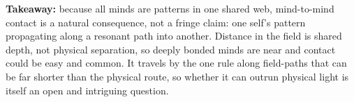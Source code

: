 \textbf{Takeaway:} because all minds are patterns in one shared web, mind-to-mind contact is a natural consequence, not a fringe claim: one self's pattern propagating along a resonant path into another. Distance in the field is shared depth, not physical separation, so deeply bonded minds are near and contact could be easy and common. It travels by the one rule along field-paths that can be far shorter than the physical route, so whether it can outrun physical light is itself an open and intriguing question.
